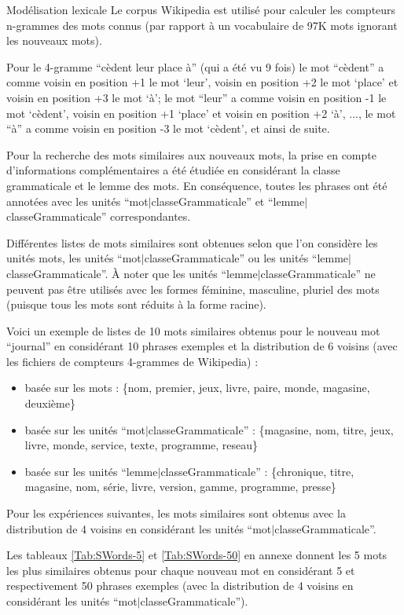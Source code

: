 \documentclass{style/these}
\begin{document}
\begin{part}{Modélisation lexicale}
Le corpus Wikipedia est utilisé pour calculer les compteurs n-grammes des mots connus (par rapport à un vocabulaire de 97K mots ignorant les nouveaux mots). 

Pour le 4-gramme ``cèdent leur place à'' (qui a été vu 9 fois) le mot ``cèdent'' a comme voisin en position +1 le mot `leur', voisin en position  +2 le mot `place' et voisin en position +3 le mot `à'; le mot ``leur'' a comme voisin en position  -1 le mot `cèdent', voisin en position  +1 `place' et voisin en position +2 `à', ..., le mot ``à'' a comme voisin en position  -3 le mot `cèdent', et ainsi de suite.

Pour la recherche des mots similaires aux nouveaux mots, la prise en compte d'informations complémentaires a été étudiée en considérant la classe grammaticale et le lemme des mots. 
En conséquence, toutes les phrases ont été annotées avec les unités ``mot$|$\linebreak classeGrammaticale'' et ``lemme$|$classeGrammaticale'' correspondantes. 

Différentes listes de mots similaires sont obtenues selon que l'on considère les unités mots, les unités ``mot$|$classeGrammaticale'' ou les unités ``lemme$|$classeGrammaticale''. À noter que les unités ``lemme$|$classeGrammaticale'' ne peuvent pas être utilisés avec les formes féminine, masculine, pluriel des mots (puisque tous les mots sont réduits à la forme racine).

Voici un exemple de listes de 10 mots similaires obtenus pour le nouveau mot ``journal'' en considérant 10 phrases exemples et la distribution de 6 voisins (avec les fichiers de compteurs 4-grammes de Wikipedia) :
\begin{itemize}
\item basée sur les mots : \{nom, premier, jeux, livre, paire, monde, magasine, deuxième\}
\item basée sur les unités ``mot$|$classeGrammaticale'' : \{magasine, nom, titre, jeux, livre, monde, service, texte, programme, reseau\}
\item basée sur les unités ``lemme$|$classeGrammaticale'' : \{chronique, titre, magasine, nom, série, livre, version, gamme, programme, presse\}
\end{itemize}

Pour les expériences suivantes, les mots similaires sont obtenus avec la \linebreak distribution de 4 voisins en considérant les unités ``mot$|$classeGrammaticale''. 

Les tableaux \ref{Tab:SWords-5} et \ref{Tab:SWords-50} en annexe donnent les 5 mots les plus similaires obtenus pour chaque nouveau mot en considérant 5 et respectivement 50 phrases exemples (avec la distribution de 4 voisins en considérant les unités ``mot$|$classeGrammaticale'').



\end{part}
\end{document}

